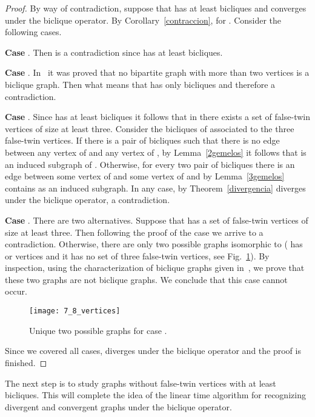 \documentclass[12pt]{article}
\begin{document}
\begin{proof} By way of contradiction, suppose that  has at least 
bicliques and  converges under the biclique operator. By
Corollary~\ref{contraccion},  for .
Consider the following cases.

\textbf{Case }. Then  is a contradiction since  has at least 
bicliques.

\textbf{Case }. In~\cite{GroshausSzwarcfiterJGT2010} it was proved that no bipartite graph with more than two vertices is a biclique graph. Then  what means that  has only  bicliques and therefore a contradiction.  

\textbf{Case }. Since  has at least  bicliques it follows that in 
there exists a set of false-twin vertices of size at least three.  Consider the
bicliques  of  associated to the three false-twin vertices. If there
is a pair of bicliques  such that there is no edge between any vertex
of  and any vertex of , by Lemma~\ref{2gemelos} it follows that 
is an induced subgraph of . Otherwise, for every two pair of bicliques
 there is an edge between some vertex of  and some vertex of
 and by Lemma~\ref{3gemelos}  contains  as an induced
subgraph. In any case, by Theorem~\ref{divergencia}  diverges under the
biclique operator, a contradiction. 

\textbf{Case }. There are two alternatives. Suppose that  has a set of false-twin
vertices of size at least three. Then following the proof of the case  we
arrive to a contradiction. Otherwise, there are only two possible graphs
isomorphic to  ( has  or  vertices and it has no set of
three false-twin vertices, see Fig.~\ref{Fig_7_8_vertices}). By inspection, using the characterization of biclique graphs given in~\cite{GroshausSzwarcfiterJGT2010},  
we prove that these two graphs are not biclique graphs. We conclude that this case cannot occur.



\begin{figure}[ht!]
	\centering
	\texttt{[image: 7\_8\_vertices]}
	\caption{Unique two possible graphs for case .}
	\label{Fig_7_8_vertices}
\end{figure}


Since we covered all cases,  diverges under the biclique operator and the
proof is finished.
\end{proof}

The next step is to study graphs without false-twin vertices with at least  bicliques.  This will complete the idea of  
the linear time algorithm for  recognizing divergent and convergent graphs under the biclique operator.
\end{document}

